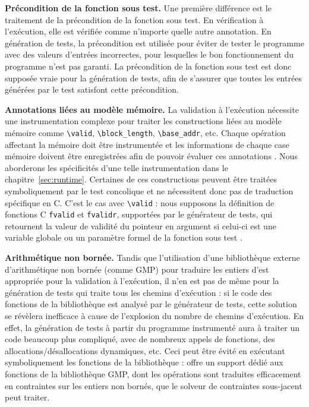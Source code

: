 \textbf{Précondition de la fonction sous test.}
Une première différence est le traitement de la précondition de la fonction sous
test.
En vérification à l'exécution, elle est vérifiée comme n'importe quelle autre
annotation.
En génération de tests, la précondition est utilisée pour éviter de tester le
programme avec des valeurs d'entrées incorrectes, pour lesquelles le bon
fonctionnement du programme n'est pas garanti.
La précondition de la fonction sous test est donc supposée vraie pour la
génération de tests, afin de s'assurer que toutes les entrées générées par le
test satisfont cette précondition.

\textbf{Annotations liées au modèle mémoire.}
La validation à l'exécution nécessite une instrumentation complexe pour traiter
les constructions \eacsl liées au modèle mémoire comme \lstinline'\valid',
\lstinline'\block_length', \lstinline'\base_addr', etc.
Chaque opération affectant la mémoire doit être instrumentée et les informations
de chaque case mémoire doivent être enregistrées afin de pouvoir évaluer ces
annotations \cite{Kosmatov/RV13}.
Nous aborderons les spécificités d'une telle instrumentation dans le
chapitre~\ref{sec:runtime}.
Certaines de ces constructions peuvent être traitées symboliquement par le test
concolique et ne nécessitent donc pas de traduction spécifique en C.
C'est le cas avec \lstinline'\valid' : nous supposons la définition de fonctions
C \lstinline'fvalid' et \lstinline'fvalidr', supportées par le générateur de
tests, qui retournent la valeur de validité du pointeur en argument si celui-ci
est une variable globale ou un paramètre formel de la fonction sous test
\cite{Chebaro/ICSSEA12}.

\textbf{Arithmétique non bornée.}
Tandis que l'utilisation d'une bibliothèque externe d'arithmétique non bornée
(comme GMP) pour traduire les entiers d'\eacsl est appropriée pour la validation
à l'exécution, il n'en est pas de même pour la génération de tests qui traite
tous les chemins d'exécution : si le code des fonctions de la bibliothèque est
analysé par le générateur de tests, cette solution se révèlera inefficace
à cause de l'explosion du nombre de chemins d'exécution.
En effet, la génération de tests à partir du programme instrumenté aura à
traiter un code beaucoup plus compliqué, avec de nombreux appels de fonctions, 
des allocations/désallocations dynamiques, etc.
Ceci peut être évité en exécutant symboliquement les fonctions de la
bibliothèque : \pathcrawler offre un support dédié aux fonctions de la
bibliothèque GMP, dont les opérations sont traduites efficacement en contraintes
sur les entiers non bornés, que le solveur de contraintes sous-jacent peut
traiter.


